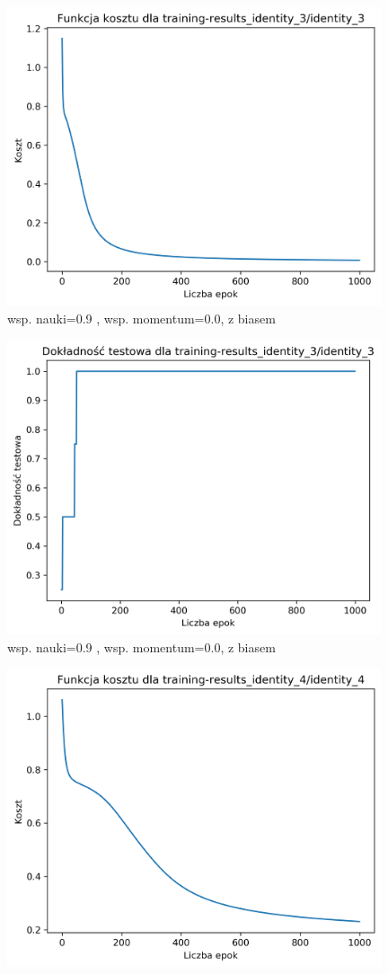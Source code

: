 \documentclass{classrep}
\begin{document}
{{\begin{figure}[!htbp]
                \centering
                \includegraphics[width=110mm]{wykresy/identity_3_cost.png}
                \caption{wsp. nauki=0.9 , wsp. momentum=0.0, z biasem}
            \end{figure}
            \begin{figure}[!htbp]
                \centering
                \includegraphics[width=110mm]{wykresy/identity_3_testing-accuracy.png}
                \caption{wsp. nauki=0.9 , wsp. momentum=0.0, z biasem}
            \end{figure}
            \FloatBarrier
            \begin{figure}[!htbp]
                \centering
                \includegraphics[width=110mm]{wykresy/identity_4_cost.png}

\end{figure}}}
\end{document}
